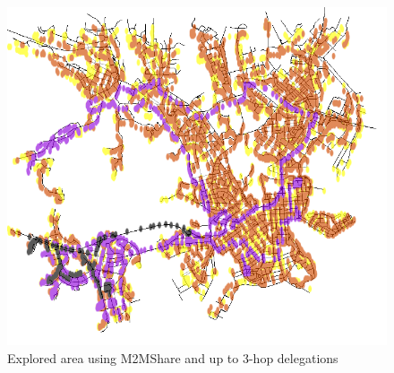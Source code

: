 \begin{figure}[htpb]
  \begin{center}
    \includegraphics[scale=0.35]{figure/mappa_3_hop.png}
    \caption{Explored area using M2MShare and up to 3-hop delegations}
    \label{mappa3Hop}
  \end{center}
\end{figure}


\pagebreak 
